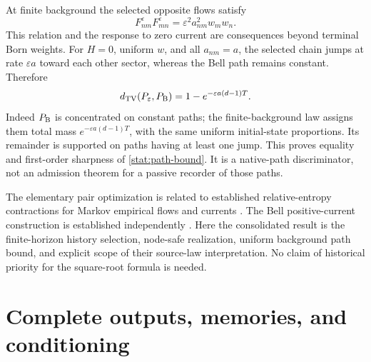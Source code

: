 \documentclass[11pt,oneside,openany]{book}
\theoremstyle{definition}
\theoremstyle{remark}\newtheorem{remark}[theorem]{Remark}
\begin{document}
At finite background the selected opposite flows satisfy
\begin{equation}\label{stat:traffic-product}
 F^\varepsilon_{nm}F^\varepsilon_{mn}
       =\varepsilon^2a_{nm}^2w_mw_n.
\end{equation}
This relation and the response to zero current are consequences beyond
terminal Born weights. For $H=0$, uniform $w$, and all $a_{nm}=a$, the
selected chain jumps at rate $\varepsilon a$ toward each other sector,
whereas the Bell path remains constant. Therefore
\begin{equation}\label{stat:sharpness}
 d_{\rm TV}(P_\varepsilon,P_{\rm B})
       =1-e^{-\varepsilon a(d-1)T}.
\end{equation}
Indeed $P_{\rm B}$ is concentrated on constant paths; the finite-background
law assigns them total mass $e^{-\varepsilon a(d-1)T}$, with the same
uniform initial-state proportions. Its remainder is supported on paths
having at least one jump. This proves equality and first-order sharpness
of \eqref{stat:path-bound}. It is a native-path discriminator, not an
admission theorem for a passive recorder of those paths.

The elementary pair optimization is related to established relative-entropy
contractions for Markov empirical flows and currents \cite{BFG}. The
Bell positive-current construction is established independently
\cite{BellQFT}. Here the consolidated result is the finite-horizon
history selection, node-safe realization, uniform background path bound,
and explicit scope of their source-law interpretation. No claim of
historical priority for the square-root formula is needed.

\section{Complete outputs, memories, and conditioning}
\end{document}
